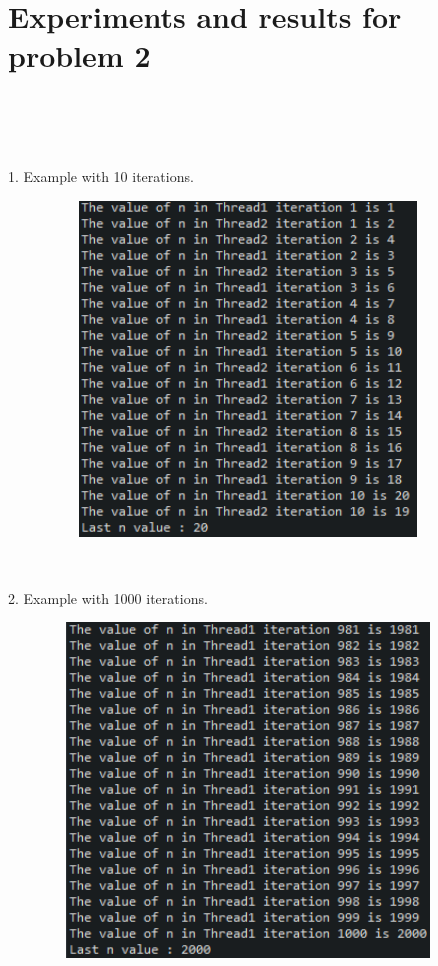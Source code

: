 \documentclass[14pt]{article}
\begin{document}
\section*{Experiments and results for problem 2}
\\\\\\
\begin{center}
1. Example with 10 iterations.
\vspace{10mm}

\includegraphics[height=3.5in, width = 5in]{problem220.png}\\
\end{center}\\
\newpage
\begin{center}
2. Example with 1000 iterations.
\vspace{10mm}

\includegraphics[height=3.5in, width = 5in]{problem22000.png}\\
\end{center}\\
\newpage
\end{document}
